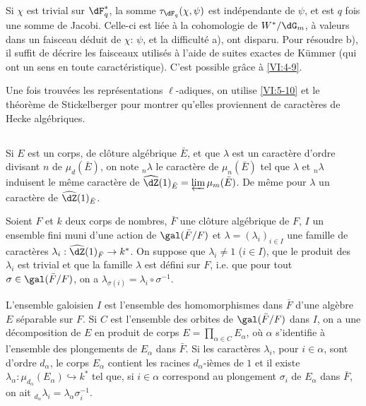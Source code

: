 Si $\chi$ est trivial sur $\dF_q^\ast$, la somme $\tau_{\dF_q}(\chi,\psi)$ 
est indépendante de $\psi$, et est $q$ fois une somme de Jacobi. Celle-ci est 
liée à la cohomologie de $W^\ast/\dG_m$, à valeurs dans un faisceau 
déduit de $\chi$: $\psi$, et la difficulté a), ont disparu. Pour 
résoudre b), il suffit de décrire les faisceaux utilisés à l'aide de 
suites exactes de K\"ummer (qui ont un sens en toute caractéristique). C'est 
possible gr\^ace à \ref{VI:4-9}. 

Une fois trouvées les représentations $\ell$-adiques, on utilise 
\ref{VI:5-10} et le théorème de Stickelberger pour montrer qu'elles 
proviennent de caractères de Hecke algébriques. 





\subsection{}\label{VI:6-1}

Si $E$ est un corps, de clôture algébrique $\bar E$, et que $\lambda$ est 
un caractère d'ordre divisant $n$ de $\mu_d(\bar E)$, on note $_n\lambda$ le 
caractère de $\mu_n(\bar E)$ tel que $\lambda$ et $_n \lambda$ induisent le 
même caractère de $\widehat\dZ(1)_{\bar E} = \varprojlim \mu_m(\bar E)$. De 
même pour $\lambda$ un caractère de $\widehat\dZ(1)_{\bar E}$. 

Soient $F$ et $k$ deux corps de nombres, $\bar F$ une clôture algébrique de 
$F$, $I$ un ensemble fini muni d'une action de $\gal(\bar F/F)$ et 
$\lambda=(\lambda_i)_{i\in I}$ une famille de caractères 
$\lambda_i:\widehat\dZ(1)_{\bar F} \to k^\ast$. On suppose que 
$\lambda_i\ne 1$ ($i\in I$), que 
le produit des $\lambda_i$ est trivial et que 
la famille $\lambda$ est défini sur $F$, i.e. que pour tout 
$\sigma\in \gal(\bar F/F)$, on a 
$\lambda_{\sigma(i)}=\lambda_i\circ \sigma^{-1}$. 

L'ensemble galoisien $I$ est l'ensemble des homomorphismes dans $\bar F$ d'une 
alg\`ebre $E$ séparable sur $F$. Si $C$ est l'ensemble des orbites de 
$\gal(\bar F/F)$ dans $I$, on a une décomposition de $E$ en produit de corps 
$E=\prod_{\alpha\in C} E_\alpha$, où $\alpha$ s'identifie à l'ensemble des 
plongements de $E_\alpha$ dans $\bar F$. Si les caractères $\lambda_i$, pour 
$i\in \alpha$, sont d'ordre $d_\alpha$, le corps $E_\alpha$ contient les 
racines $d_\alpha$-ièmes de $1$ et il existe 
$\lambda_\alpha:\mu_{d_\alpha}(E_\alpha) \hookrightarrow k^\ast$  tel que, si 
$i\in \alpha$ correspond au plongement $\sigma_i$ de $E_\alpha$ dans $\bar F$, 
on ait $_{d_\alpha} \lambda_i = \lambda_\alpha \sigma_i^{-1}$. 





